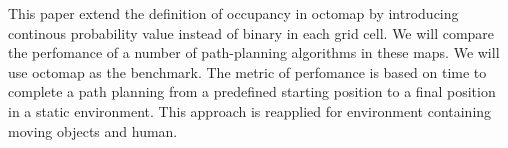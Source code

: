 \documentclass[a4paper,10pt]{article}
\begin{document}
This paper extend the definition of occupancy in octomap by introducing
continous probability value instead of binary in each grid cell. We will compare
the perfomance of a number of path-planning algorithms in these maps. We will use octomap as the
benchmark. The metric of perfomance is based on time to complete a path planning
from a predefined starting position to a final position in a static environment.
This approach is reapplied for environment containing moving objects and human.


\end{document}
